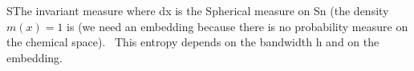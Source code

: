 SThe invariant measure where dx is the Spherical measure on Sn (the density $m(x)=1$ is (we need an embedding because there is no probability measure on the chemical space). 
This entropy depends on the bandwidth h and on the embedding.
